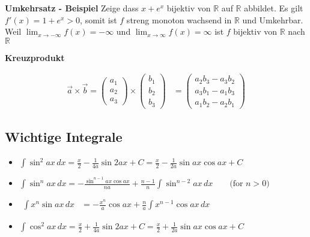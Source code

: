 \documentclass[25pt]{sciposter}
\newcommand{\R}{\mathbb{R}}
\newenvironment{method}[1]{\begin{mdframed}[backgroundcolor=blue!10,innertopmargin=15pt, innerbottommargin=15pt,nobreak=true]
		\textbf{#1 }
	}
	{ 
	\end{mdframed}
}
\begin{document}
\begin{multicols}{3}
\textbf{Umkehrsatz - Beispiel} Zeige dass $x + e^x$ bijektiv von $\R$ auf $\R$ abbildet. Es gilt $f'(x) = 1 + e^x > 0$, somit ist $f$ streng monoton wachsend in $\R$ und Umkehrbar. Weil $\lim_{x \to -\infty} f(x) = - \infty$ und $\lim_{x \to \infty} f(x) = \infty$ ist $f$ bijektiv von $\R$ nach $\R$



\begin{method}{Kreuzprodukt}
	\begin{align*}
	\vec{a}\times\vec{b}=	\begin{pmatrix}a_1 \\ a_2 \\ a_3\end{pmatrix}
	\times
	\begin{pmatrix}b_1 \\ b_2 \\ b_3 \end{pmatrix} &=	\begin{pmatrix}
	a_2b_3 - a_3b_2 \\
	a_3b_1 - a_1b_3 \\
	a_1b_2 - a_2b_1
	\end{pmatrix}
	\end{align*}
\end{method}

\newpage

\subsection*{Wichtige Integrale}

\begin{itemize}	
	
	\item ${\displaystyle \int \sin ^{2}{ax}\,dx={\frac {x}{2}}-{\frac {1}{4a}}\sin 2ax+C={\frac {x}{2}}-{\frac {1}{2a}}\sin ax\cos ax+C}$
	
	\item ${\displaystyle \int \sin ^{n}{ax}\,dx=-{\frac {\sin ^{n-1}ax\cos ax}{na}}+{\frac {n-1}{n}}\int \sin ^{n-2}ax\,dx\qquad {\mbox{(for }}n>0{\mbox{)}}}$
	
	\item ${\displaystyle {\begin{aligned}\int x^{n}\sin ax\,dx&=-{\frac {x^{n}}{a}}\cos ax+{\frac {n}{a}}\int x^{n-1}\cos ax\,dx\end{aligned}}}$
	
	\item ${\displaystyle \int \cos ^{2}{ax}\,dx={\frac {x}{2}}+{\frac {1}{4a}}\sin 2ax+C={\frac {x}{2}}+{\frac {1}{2a}}\sin ax\cos ax+C}$
	

\end{itemize}
\end{multicols}
\end{document}

